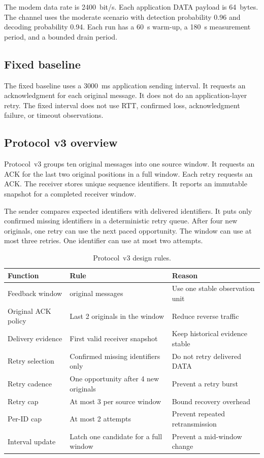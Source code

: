 \documentclass[11pt]{article}
\begin{document}
The modem data rate is 2400~bit/s.
Each application DATA payload is 64~bytes.
The channel uses the moderate scenario with detection probability 0.96 and decoding probability 0.94.
Each run has a 60~s warm-up, a 180~s measurement period, and a bounded drain period.

\subsection{Fixed baseline}\label{sec:prop-fixed}
\noindent
The fixed baseline uses a 3000~ms application sending interval.
It requests an acknowledgment for each original message.
It does not do an application-layer retry.
The fixed interval does not use RTT, confirmed loss, acknowledgment failure, or timeout observations.

\subsection{Protocol v3 overview}\label{sec:prop-v3}
\noindent
Protocol~v3 groups ten original messages into one source window.
It requests an ACK for the last two original positions in a full window.
Each retry requests an ACK.
The receiver stores unique sequence identifiers.
It reports an immutable snapshot for a completed receiver window.

The sender compares expected identifiers with delivered identifiers.
It puts only confirmed missing identifiers in a deterministic retry queue.
After four new originals, one retry can use the next paced opportunity.
The window can use at most three retries.
One identifier can use at most two attempts.

\begin{table}[H]
\centering\footnotesize
\caption{Protocol~v3 design rules.}\label{tab:v3-rules}
\begin{tabular}{>{\raggedright\arraybackslash}p{3.0cm} >{\raggedright\arraybackslash}p{5.2cm} >{\raggedright\arraybackslash}p{6.0cm}}
\toprule
Function & Rule & Reason \\
\midrule
Feedback window & 10 original messages & Use one stable observation unit \\
Original ACK policy & Last 2 originals in the window & Reduce reverse traffic \\
Delivery evidence & First valid receiver snapshot & Keep historical evidence stable \\
Retry selection & Confirmed missing identifiers only & Do not retry delivered DATA \\
Retry cadence & One opportunity after 4 new originals & Prevent a retry burst \\
Retry cap & At most 3 per source window & Bound recovery overhead \\
Per-ID cap & At most 2 attempts & Prevent repeated retransmission \\
Interval update & Latch one candidate for a full window & Prevent a mid-window change \\
\bottomrule
\end{tabular}
\end{table}
\end{document}
